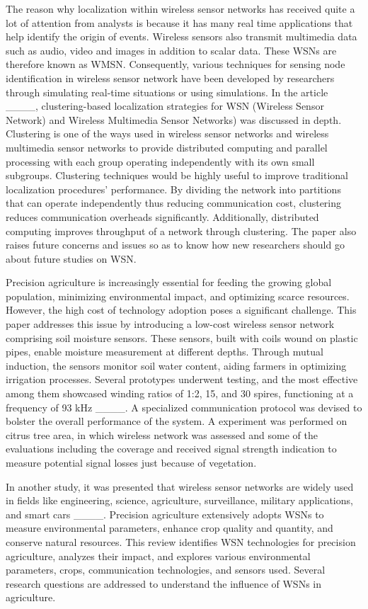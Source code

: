 The reason why localization within wireless sensor networks has received quite a lot of attention from analysts is because it has many real time applications that help identify the origin of events. Wireless sensors also transmit multimedia data such as audio, video and images in addition to scalar data. These WSNs are therefore known as WMSN. Consequently, various techniques for sensing node identification in wireless sensor network have been developed by researchers through simulating real-time situations or using simulations. In the article ____, clustering-based localization strategies for WSN (Wireless Sensor Network) and Wireless Multimedia Sensor Networks) was discussed in depth. Clustering is one of the ways used in wireless sensor networks and wireless multimedia sensor networks to provide distributed computing and parallel processing with each group operating independently with its own small subgroups. Clustering techniques would be highly useful to improve traditional localization procedures’ performance. By dividing the network into partitions that can operate independently thus reducing communication cost, clustering reduces communication overheads significantly. Additionally, distributed computing improves throughput of a network through clustering. The paper also raises future concerns and issues so as to know how new researchers should go about future studies on WSN.

Precision agriculture is increasingly essential for feeding the growing global population, minimizing environmental impact, and optimizing scarce resources. However, the high cost of technology adoption poses a significant challenge. This paper addresses this issue by introducing a low-cost wireless sensor network comprising soil moisture sensors. These sensors, built with coils wound on plastic pipes, enable moisture measurement at different depths. Through mutual induction, the sensors monitor soil water content, aiding farmers in optimizing irrigation processes. Several prototypes underwent testing, and the most effective among them showcased winding ratios of 1:2, 15, and 30 spires, functioning at a frequency of 93 kHz ____. A specialized communication protocol was devised to bolster the overall performance of the system. A experiment was performed on citrus tree area, in which wireless network was assessed and some of the evaluations including the coverage and received signal strength indication to measure potential signal losses just because of vegetation.

In another study, it was presented that wireless sensor networks are widely used in fields like engineering, science, agriculture, surveillance, military applications, and smart cars ____. Precision agriculture extensively adopts WSNs to measure environmental parameters, enhance crop quality and quantity, and conserve natural resources. This review identifies WSN technologies for precision agriculture, analyzes their impact, and explores various environmental parameters, crops, communication technologies, and sensors used. Several research questions are addressed to understand the influence of WSNs in agriculture.

